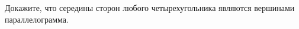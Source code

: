 \begin{ex}
	\begin{condition}
		Докажите, что середины сторон любого четырехугольника являются вершинами параллелограмма.
	\end{condition}
\end{ex}